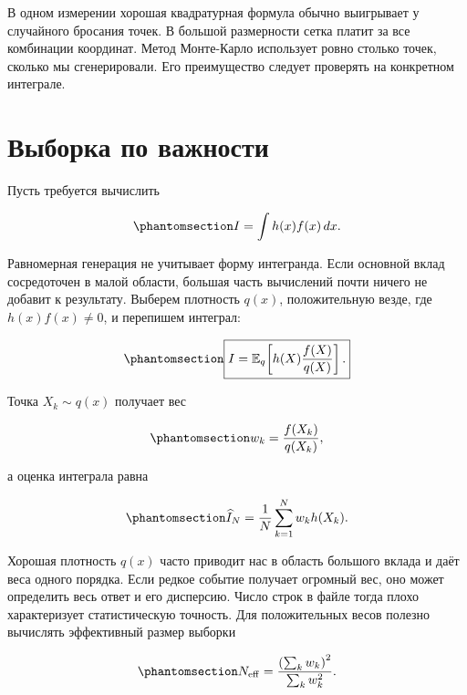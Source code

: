 \documentclass[
  russian,
  11pt,
  a4paper,
  open=any]{scrbook}
\begin{document}
В одном измерении хорошая квадратурная формула обычно выигрывает у
случайного бросания точек. В большой размерности сетка платит за все
комбинации координат. Метод Монте-Карло использует ровно столько точек,
сколько мы сгенерировали. Его преимущество следует проверять на
конкретном интеграле.

\section{Выборка по
важности}\label{ux432ux44bux431ux43eux440ux43aux430-ux43fux43e-ux432ux430ux436ux43dux43eux441ux442ux438}

Пусть требуется вычислить

\begin{equation}\protect\phantomsection\label{eq-ch8-importance-target-integral}{
I=\int h(x)f(x)\,dx.
}\end{equation}

Равномерная генерация не учитывает форму интегранда. Если основной вклад
сосредоточен в малой области, большая часть вычислений почти ничего не
добавит к результату. Выберем плотность \(q(x)\), положительную везде,
где \(h(x)f(x)\neq0\), и перепишем интеграл:

\begin{equation}\protect\phantomsection\label{eq-ch8-importance-sampling}{
\boxed{
I=\mathbb E_q\!\left[
h(X)\frac{f(X)}{q(X)}
\right].
}
}\end{equation}

Точка \(X_k\sim q(x)\) получает вес

\begin{equation}\protect\phantomsection\label{eq-ch8-importance-weight}{
w_k=\frac{f(X_k)}{q(X_k)},
}\end{equation}

а оценка интеграла равна

\begin{equation}\protect\phantomsection\label{eq-ch8-importance-estimator}{
\widehat I_N
=\frac1N\sum_{k=1}^{N}w_k h(X_k).
}\end{equation}

Хорошая плотность \(q(x)\) часто приводит нас в область большого вклада
и даёт веса одного порядка. Если редкое событие получает огромный вес,
оно может определить весь ответ и его дисперсию. Число строк в файле
тогда плохо характеризует статистическую точность. Для положительных
весов полезно вычислять эффективный размер выборки

\begin{equation}\protect\phantomsection\label{eq-ch8-effective-sample-size}{
N_{\mathrm{eff}}
=\frac{\left(\sum_k w_k\right)^2}{\sum_k w_k^2}.
}\end{equation}
\end{document}
